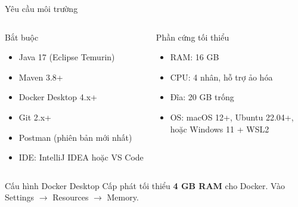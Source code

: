 \documentclass[aspectratio=169,12pt]{beamer}
\begin{document}
\begin{frame}{Yêu cầu môi trường}
  \begin{columns}
    \begin{block}{Bắt buộc}
      \begin{itemize}
        \item Java 17 (Eclipse Temurin)
        \item Maven 3.8+
        \item Docker Desktop 4.x+
        \item Git 2.x+
        \item Postman (phiên bản mới nhất)
        \item IDE: IntelliJ IDEA hoặc VS Code
      \end{itemize}
    \end{block}

    \begin{block}{Phần cứng tối thiểu}
      \begin{itemize}
        \item RAM: 16 GB
        \item CPU: 4 nhân, hỗ trợ ảo hóa
        \item Đĩa: 20 GB trống
        \item OS: macOS 12+, Ubuntu 22.04+,\\
              hoặc Windows 11 + WSL2
      \end{itemize}
    \end{block}
  \end{columns}

  \vspace{0.5em}
  \begin{alertblock}{Cấu hình Docker Desktop}
    Cấp phát tối thiểu \textbf{4 GB RAM} cho Docker. Vào Settings $\to$
    Resources $\to$ Memory.
  \end{alertblock}
\end{frame}
\end{document}
